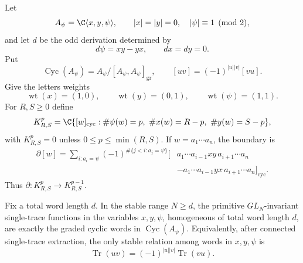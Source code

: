 \begin{defn}
\label{def:app-full-psi-complex}
  Let
	  \[
	    A_\psi=\C\langle x,y,\psi\rangle,\qquad
	    |x|=|y|=0,\quad |\psi|\equiv1\pmod 2,
	  \]
  and let \(d\) be the odd derivation determined by
  \[
    d\psi=xy-yx,\qquad dx=dy=0.
  \]
  Put
  \[
    \operatorname{Cyc}(A_\psi)
      =A_\psi/[A_\psi,A_\psi]_{\mathrm{gr}},
      \qquad [uv]=(-1)^{|u||v|}[vu].
  \]
  Give the letters weights
  \[
    \operatorname{wt}(x)=(1,0),\qquad
    \operatorname{wt}(y)=(0,1),\qquad
    \operatorname{wt}(\psi)=(1,1).
  \]
  For \(R,S\geq0\) define
  \[
    K^p_{R,S}
      =
      \C\{[w]_{\mathrm{cyc}}:
        \#\psi(w)=p,\ \#x(w)=R-p,\ \#y(w)=S-p\},
  \]
  with \(K^p_{R,S}=0\) unless \(0\leq p\leq\min(R,S)\).  If
  \(w=a_1\cdots a_n\), the boundary is
  \[
  \begin{aligned}
    \partial[w]
      =
      \sum_{i:a_i=\psi}(-1)^{\#\{j<i:a_j=\psi\}}
      [&a_1\cdots a_{i-1}xy\,a_{i+1}\cdots a_n\\
       &-a_1\cdots a_{i-1}yx\,a_{i+1}\cdots a_n]_{\mathrm{cyc}} .
  \end{aligned}
  \]
  Thus \(\partial:K^p_{R,S}\to K^{p-1}_{R,S}\).
\end{defn}

\begin{lem}
\label{lem:app-full-stable-super-traces}
  Fix a total word length \(d\).  In the stable range \(N\geq d\), the
  primitive \(GL_N\)-invariant single-trace functions in the variables
  \(x,y,\psi\), homogeneous of total word length \(d\), are exactly the
  graded cyclic words in \(\operatorname{Cyc}(A_\psi)\).  Equivalently, after
  connected single-trace extraction, the only stable relation among words in
  \(x,y,\psi\) is
  \[
    \operatorname{Tr}(uv)=(-1)^{|u||v|}\operatorname{Tr}(vu).
  \]
\end{lem}

